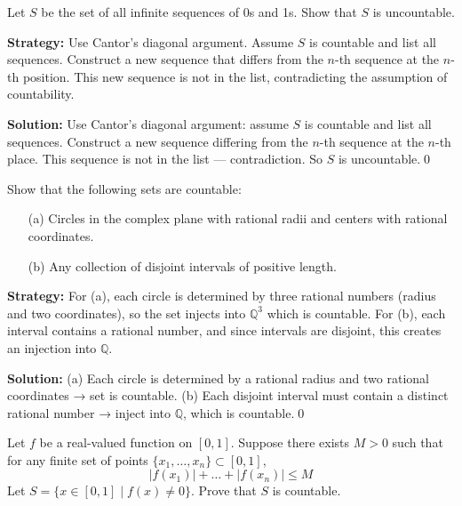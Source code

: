\begin{problembox}
Let \( S \) be the set of all infinite sequences of 0s and 1s. Show that \( S \) is uncountable.
\end{problembox}

\noindent\textbf{Strategy:} Use Cantor's diagonal argument. Assume $S$ is countable and list all sequences. Construct a new sequence that differs from the $n$-th sequence at the $n$-th position. This new sequence is not in the list, contradicting the assumption of countability.

\bigskip\noindent\textbf{Solution:}  
Use Cantor's diagonal argument: assume \( S \) is countable and list all sequences.  
Construct a new sequence differing from the \( n \)-th sequence at the \( n \)-th place.  
This sequence is not in the list — contradiction. So \( S \) is uncountable.\qed



\begin{problembox}
Show that the following sets are countable:
\begin{itemize}
\item[(a)] Circles in the complex plane with rational radii and centers with rational coordinates.
\item[(b)] Any collection of disjoint intervals of positive length.
\end{itemize}
\end{problembox}

\noindent\textbf{Strategy:} For (a), each circle is determined by three rational numbers (radius and two coordinates), so the set injects into $\mathbb{Q}^3$ which is countable. For (b), each interval contains a rational number, and since intervals are disjoint, this creates an injection into $\mathbb{Q}$.

\bigskip\noindent\textbf{Solution:}  
(a) Each circle is determined by a rational radius and two rational coordinates → set is countable.  
(b) Each disjoint interval must contain a distinct rational number → inject into \( \mathbb{Q} \), which is countable.\qed



\begin{problembox}
Let \( f \) be a real-valued function on \( [0,1] \). Suppose there exists \( M > 0 \) such that for any finite set of points \( \{x_1, \dots, x_n\} \subset [0,1] \),  
\[
|f(x_1)| + \dots + |f(x_n)| \le M
\]  
Let \( S = \{x \in [0,1] \mid f(x) \ne 0\} \). Prove that \( S \) is countable.
\end{problembox}

